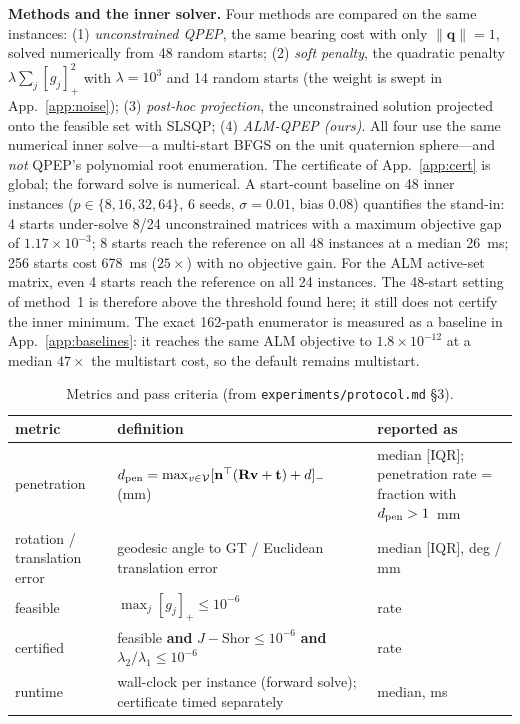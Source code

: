 \textbf{Methods and the inner solver.} Four methods are compared on the same instances: (1) \emph{unconstrained QPEP}, the same bearing cost with only $\|\mathbf q\|=1$, solved numerically from 48 random starts; (2) \emph{soft penalty}, the quadratic penalty $\lambda\sum_j[g_j]_+^2$ with $\lambda=10^3$ and 14 random starts (the weight is swept in App.~\ref{app:noise}); (3) \emph{post-hoc projection}, the unconstrained solution projected onto the feasible set with SLSQP; (4) \emph{ALM-QPEP (ours)}. All four use the same numerical inner solve---a multi-start BFGS on the unit quaternion sphere---and \emph{not} QPEP's polynomial root enumeration. The certificate of App.~\ref{app:cert} is global; the forward solve is numerical. A start-count baseline on 48 inner instances ($p\in\{8,16,32,64\}$, 6 seeds, $\sigma=0.01$, bias $0.08$) quantifies the stand-in: 4 starts under-solve 8/24 unconstrained matrices with a maximum objective gap of $1.17\times10^{-3}$; 8 starts reach the reference on all 48 instances at a median 26~ms; 256 starts cost 678~ms ($25\times$) with no objective gain. For the ALM active-set matrix, even 4 starts reach the reference on all 24 instances. The 48-start setting of method~1 is therefore above the threshold found here; it still does not certify the inner minimum. The exact 162-path enumerator is measured as a baseline in App.~\ref{app:baselines}: it reaches the same ALM objective to $1.8\times10^{-12}$ at a median $47\times$ the multistart cost, so the default remains multistart.

\begin{table}[t]
\centering
\caption{Metrics and pass criteria (from \texttt{experiments/protocol.md} \S3).}
\label{tab:app_metrics}
\scriptsize
\setlength{\tabcolsep}{3pt}
\begin{tabular}{@{}p{1.55cm}p{3.6cm}p{2.1cm}@{}}
\toprule
metric & definition & reported as \\
\midrule
penetration & $d_{\rm pen}=\max_{v\in\mathcal V}[\mathbf n^\top(\mathbf R\mathbf v+\mathbf t)+d]_-$ (mm) & median [IQR]; penetration rate = fraction with $d_{\rm pen}>1$~mm \\
rotation / translation error & geodesic angle to GT / Euclidean translation error & median [IQR], deg / mm \\
feasible & $\max_j[g_j]_+\le10^{-6}$ & rate \\
certified & feasible \textbf{and} $J-\mathrm{Shor}\le10^{-6}$ \textbf{and} $\lambda_2/\lambda_1\le10^{-6}$ & rate \\
runtime & wall-clock per instance (forward solve); certificate timed separately & median, ms \\
\bottomrule
\end{tabular}
\end{table}

